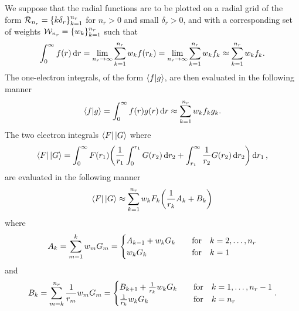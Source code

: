 \documentclass{article}
\begin{document}
We suppose that the radial functions are to be plotted on a radial grid of the
form $\mathcal{R}_{n_{r}} = \lrset{k \delta_{r}}_{k = 1}^{n_{r}}$ for
$n_{r} > 0$ and small $\delta_{r} > 0$, and with a corresponding set of weights
$\mathcal{W}_{n_{r}} = \lrset{w_{k}}_{k = 1}^{n_{r}}$ such that
\begin{equation*}
  \int_{0}^{\infty}
  {
    f\lr{r}
  }
  \dd{r}
  =
  \lim_{n_{r} \to \infty}
  \sum_{k = 1}^{n_{r}}
  {
    w_{k}
    f\lr{r_{k}}
  }
  =
  \lim_{n_{r} \to \infty}
  \sum_{k = 1}^{n_{r}}
  {
    w_{k}
    f_{k}
  }
  \approx
  \sum_{k = 1}^{n_{r}}
  {
    w_{k}
    f_{k}
  }
  .
\end{equation*}
The one-electron integrals, of the form $\braket{f}{g}$, are then
evaluated in the following manner
\begin{equation*}
  \braket{f}{g}
  =
  \int_{0}^{\infty}
  {
    f\lr{r}
    g\lr{r}
  }
  \dd{r}
  \approx
  \sum_{k = 1}^{n_{r}}
  {
    w_{k}
    f_{k}
    g_{k}
  }
  .
\end{equation*}
The two electron integrals $\bra{F} {} \ket{G}$ where
\begin{equation*}
  \bra{F} {} \ket{G}
  =
  \int_{0}^{\infty}
  {
    F\lr{r_{1}}
    \lr[\bigg]
    {
      \dfrac{1}{r_{1}}
      \int_{0}^{r_{1}}
      {
        G\lr{r_{2}}
      }
      \dd{r_{2}}
      +
      \int_{r_{1}}^{\infty}
      {
        \dfrac{1}{r_{2}}
        G\lr{r_{2}}
      }
      \dd{r_{2}}
    }
  }
  \dd{r_{1}}
  ,
\end{equation*}
are evaluated in the following manner
\begin{equation*}
  \bra{F} {} \ket{G}
  \approx
  \sum_{k = 1}^{n_{r}}
  {
    w_{k}
    F_{k}
    \lr[\bigg]
    {
      \dfrac{1}{r_{k}}
      A_{k}
      +
      B_{k}
    }
  }
\end{equation*}
where
\begin{equation*}
  A_{k}
  =
  \sum_{m = 1}^{k}
  {
    w_{m}
    G_{m}
  }
  =
  \begin{cases}
    A_{k - 1}
    +
    w_{k}
    G_{k}
    &
    \qq{for}
    k = 2, \dotsc, n_{r}
    \\
    w_{k}
    G_{k}
    &
    \qq{for}
    k = 1
  \end{cases}
\end{equation*}
and
\begin{equation*}
  B_{k}
  =
  \sum_{m = k}^{n_{r}}
  {
    \dfrac{1}{r_{m}}
    w_{m}
    G_{m}
  }
  =
  \begin{cases}
    B_{k + 1}
    +
    \tfrac{1}{r_{k}}
    w_{k}
    G_{k}
    &
    \qq{for}
    k = 1, \dotsc, n_{r} - 1
    \\
    \tfrac{1}{r_{k}}
    w_{k}
    G_{k}
    &
    \qq{for}
    k = n_{r}
  \end{cases}
  .
\end{equation*}
\end{document}
